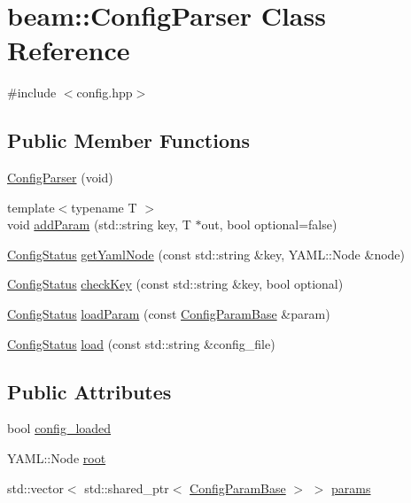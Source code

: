 \hypertarget{classbeam_1_1_config_parser}{}\section{beam\+:\+:Config\+Parser Class Reference}
\label{classbeam_1_1_config_parser}


{\ttfamily \#include $<$config.\+hpp$>$}

\subsection*{Public Member Functions}
\begin{DoxyCompactItemize}
\item 
\hyperlink{classbeam_1_1_config_parser_a1f2a583c9eb00c93da60d14711b4389a}{Config\+Parser} (void)
\item 
{\footnotesize template$<$typename T $>$ }\\void \hyperlink{classbeam_1_1_config_parser_a06f647e3b6a20452877dda482854fa8c}{add\+Param} (std\+::string key, T $\ast$out, bool optional=false)
\item 
\hyperlink{group__utils_ga6b948c6f49abd3a3de95390efacfba63}{Config\+Status} \hyperlink{classbeam_1_1_config_parser_a347d9487325f54f158b2c6d748c38448}{get\+Yaml\+Node} (const std\+::string \&key, Y\+A\+M\+L\+::\+Node \&node)
\item 
\hyperlink{group__utils_ga6b948c6f49abd3a3de95390efacfba63}{Config\+Status} \hyperlink{classbeam_1_1_config_parser_a908bfee0c4dda2fda2a6deae9edd98df}{check\+Key} (const std\+::string \&key, bool optional)
\item 
\hyperlink{group__utils_ga6b948c6f49abd3a3de95390efacfba63}{Config\+Status} \hyperlink{classbeam_1_1_config_parser_a990c530e4f94f88a81d46c8fd38bbd92}{load\+Param} (const \hyperlink{structbeam_1_1_config_param_base}{Config\+Param\+Base} \&param)
\item 
\hyperlink{group__utils_ga6b948c6f49abd3a3de95390efacfba63}{Config\+Status} \hyperlink{classbeam_1_1_config_parser_a28dd7f968674139ed0bbc4fcdb01f514}{load} (const std\+::string \&config\+\_\+file)
\end{DoxyCompactItemize}
\subsection*{Public Attributes}
\begin{DoxyCompactItemize}
\item 
bool \hyperlink{classbeam_1_1_config_parser_a4d9b8c9944779dfccae586ac3a337987}{config\+\_\+loaded}
\item 
Y\+A\+M\+L\+::\+Node \hyperlink{classbeam_1_1_config_parser_af7194358406b989236ad11515a19d963}{root}
\item 
std\+::vector$<$ std\+::shared\+\_\+ptr$<$ \hyperlink{structbeam_1_1_config_param_base}{Config\+Param\+Base} $>$ $>$ \hyperlink{classbeam_1_1_config_parser_adb1a9f52c1ee4bf974088519237dcefc}{params}
\end{DoxyCompactItemize}


